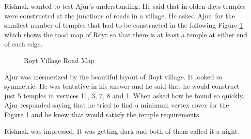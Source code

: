 Rishnak wanted to test Ajur's understanding. He said that in olden days temples were constructed at the junctions of roads in a village. He asked Ajur, for the smallest number of temples that had to be constructed in the following Figure \ref{13g6} which shows the road map of Royt so that there is at least a temple at either end of each edge.
\begin{figure}
\begin{center}

\caption{ Royt Village Road Map}\label{13g6}
\end{center}
\end{figure}

Ajur was mesmerized by the beautiful layout of Royt village. It looked so symmetric. He was tentative in his answer and he said that he would construct just 5 temples in vertices 11, 3, 7, 8 and 1.   When asked how he found so quickly. Ajur responded saying that he tried to find a minimum vertex cover for the Figure \ref{13g6} and he knew that would satisfy the temple requirements.

Rishnak was impressed. It was getting dark and both of them called it a night.
